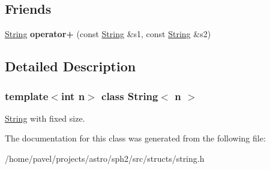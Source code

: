 \subsection*{Friends}
\begin{DoxyCompactItemize}
\item 
\hypertarget{classString_aa32f7361ca2291f8996eec46dd3baaed}{}\label{classString_aa32f7361ca2291f8996eec46dd3baaed} 
\hyperlink{classString}{String} {\bfseries operator+} (const \hyperlink{classString}{String} \&s1, const \hyperlink{classString}{String} \&s2)
\end{DoxyCompactItemize}


\subsection{Detailed Description}
\subsubsection*{template$<$int n$>$\newline
class String$<$ n $>$}

\hyperlink{classString}{String} with fixed size. 

The documentation for this class was generated from the following file\+:\begin{DoxyCompactItemize}
\item 
/home/pavel/projects/astro/sph2/src/structs/string.\+h\end{DoxyCompactItemize}
